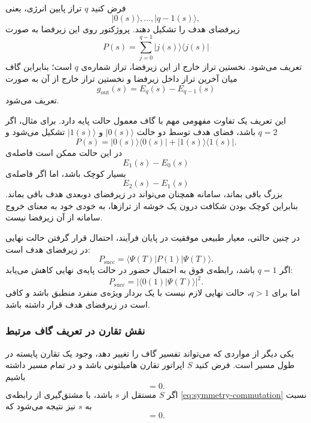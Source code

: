 فرض کنید $q$ تراز پایین انرژی، یعنی
\[
|0(s)\rangle,\ldots,|q-1(s)\rangle,
\]
زیر‌فضای هدف را تشکیل دهند. پروژکتور روی این زیر‌فضا به صورت
\begin{equation}
	P(s)
	=
	\sum_{j=0}^{q-1}
	|j(s)\rangle\langle j(s)|
	\label{eq:target-projector}
\end{equation}
تعریف می‌شود. نخستین تراز خارج از این زیر‌فضا، تراز شماره‌ی $q$ است؛
بنابراین گاف میان آخرین تراز داخل زیر‌فضا و نخستین تراز خارج از آن
به صورت
\begin{equation}
	g_{\mathrm{out}}(s)
	=
	E_q(s)-E_{q-1}(s)
	\label{eq:subspace-gap}
\end{equation}
تعریف می‌شود.

این تعریف یک تفاوت مفهومی مهم با گاف معمول حالت پایه دارد. برای
مثال، اگر $q=2$ باشد، فضای هدف توسط دو حالت
$|0(s)\rangle$ و $|1(s)\rangle$ تشکیل می‌شود و
\begin{equation}
	P(s)
	=
	|0(s)\rangle\langle0(s)|
	+
	|1(s)\rangle\langle1(s)|.
\end{equation}
در این حالت ممکن است فاصله‌ی
\[
E_1(s)-E_0(s)
\]
بسیار کوچک باشد، اما اگر فاصله‌ی
\[
E_2(s)-E_1(s)
\]
بزرگ باقی بماند، سامانه همچنان می‌تواند در زیر‌فضای دوبعدی هدف
باقی بماند. بنابراین کوچک بودن شکافت درون یک خوشه از ترازها، به
خودی خود به معنای خروج سامانه از آن زیر‌فضا نیست.

در چنین حالتی، معیار طبیعی موفقیت در پایان فرآیند، احتمال قرار گرفتن
حالت نهایی در زیر‌فضای هدف است:
\begin{equation}
	P_{\mathrm{succ}}
	=
	\langle\Psi(T)|P(1)|\Psi(T)\rangle.
	\label{eq:success-probability}
\end{equation}
اگر $q=1$ باشد، رابطه‌ی فوق به احتمال حضور در حالت پایه‌ی نهایی
کاهش می‌یابد:
\begin{equation}
	P_{\mathrm{succ}}
	=
	|\langle0(1)|\Psi(T)\rangle|^2.
\end{equation}
اما برای $q>1$، حالت نهایی لازم نیست با یک بردار ویژه‌ی منفرد
منطبق باشد و کافی است در زیر‌فضای هدف قرار داشته باشد.

\subsubsection{نقش تقارن در تعریف گاف مرتبط}

یکی دیگر از مواردی که می‌تواند تفسیر گاف را تغییر دهد، وجود یک
تقارن پایسته در طول مسیر است. فرض کنید $S$ اپراتور تقارن هامیلتونی
باشد و در تمام مسیر داشته باشیم
\begin{equation}
	[H(s),S]=0.
	\label{eq:symmetry-commutation}
\end{equation}
اگر $S$ مستقل از $s$ باشد، با مشتق‌گیری از رابطه‌ی
\eqref{eq:symmetry-commutation} نسبت به $s$ نیز نتیجه می‌شود که
\begin{equation}
	[\partial_s H(s),S]=0.
	\label{eq:derivative-symmetry}
\end{equation}

